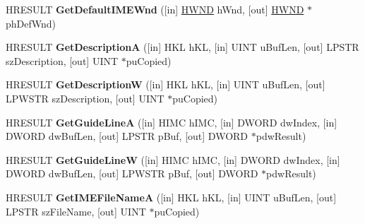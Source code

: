 \begin{DoxyCompactItemize}
\item 
\mbox{\label{interface_i_active_i_m_m_app_ac47f98353b75eee08747c01daa72dc26}} 
H\+R\+E\+S\+U\+LT {\bfseries Get\+Default\+I\+M\+E\+Wnd} (\mbox{[}in\mbox{]} \hyperlink{interfacevoid}{H\+W\+ND} h\+Wnd, \mbox{[}out\mbox{]} \hyperlink{interfacevoid}{H\+W\+ND} $\ast$ph\+Def\+Wnd)
\item 
\mbox{\label{interface_i_active_i_m_m_app_aef44f67174211e24b316612aa422da34}} 
H\+R\+E\+S\+U\+LT {\bfseries Get\+DescriptionA} (\mbox{[}in\mbox{]} H\+KL h\+KL, \mbox{[}in\mbox{]} U\+I\+NT u\+Buf\+Len, \mbox{[}out\mbox{]} L\+P\+S\+TR sz\+Description, \mbox{[}out\mbox{]} U\+I\+NT $\ast$pu\+Copied)
\item 
\mbox{\label{interface_i_active_i_m_m_app_a69bb7c563f5f4215960d89ae4810442f}} 
H\+R\+E\+S\+U\+LT {\bfseries Get\+DescriptionW} (\mbox{[}in\mbox{]} H\+KL h\+KL, \mbox{[}in\mbox{]} U\+I\+NT u\+Buf\+Len, \mbox{[}out\mbox{]} L\+P\+W\+S\+TR sz\+Description, \mbox{[}out\mbox{]} U\+I\+NT $\ast$pu\+Copied)
\item 
\mbox{\label{interface_i_active_i_m_m_app_a4e73008622cb23735e91adfe3c408679}} 
H\+R\+E\+S\+U\+LT {\bfseries Get\+Guide\+LineA} (\mbox{[}in\mbox{]} H\+I\+MC h\+I\+MC, \mbox{[}in\mbox{]} D\+W\+O\+RD dw\+Index, \mbox{[}in\mbox{]} D\+W\+O\+RD dw\+Buf\+Len, \mbox{[}out\mbox{]} L\+P\+S\+TR p\+Buf, \mbox{[}out\mbox{]} D\+W\+O\+RD $\ast$pdw\+Result)
\item 
\mbox{\label{interface_i_active_i_m_m_app_afdbcdc8fde257c3e35c6da3c26a9acd3}} 
H\+R\+E\+S\+U\+LT {\bfseries Get\+Guide\+LineW} (\mbox{[}in\mbox{]} H\+I\+MC h\+I\+MC, \mbox{[}in\mbox{]} D\+W\+O\+RD dw\+Index, \mbox{[}in\mbox{]} D\+W\+O\+RD dw\+Buf\+Len, \mbox{[}out\mbox{]} L\+P\+W\+S\+TR p\+Buf, \mbox{[}out\mbox{]} D\+W\+O\+RD $\ast$pdw\+Result)
\item 
\mbox{\label{interface_i_active_i_m_m_app_a59826827ed853db8e8e1cbc2925f0476}} 
H\+R\+E\+S\+U\+LT {\bfseries Get\+I\+M\+E\+File\+NameA} (\mbox{[}in\mbox{]} H\+KL h\+KL, \mbox{[}in\mbox{]} U\+I\+NT u\+Buf\+Len, \mbox{[}out\mbox{]} L\+P\+S\+TR sz\+File\+Name, \mbox{[}out\mbox{]} U\+I\+NT $\ast$pu\+Copied)

\end{DoxyCompactItemize}
